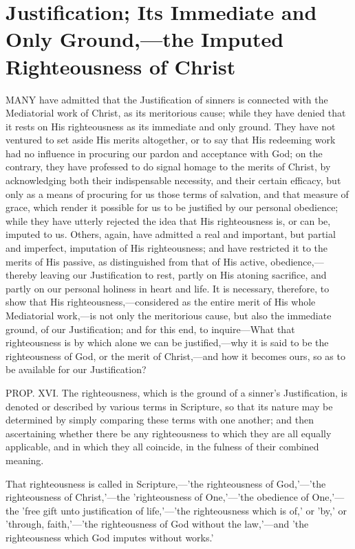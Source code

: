 \documentclass[
]{book}
\begin{document}
\hypertarget{justification-its-immediate-and-only-groundthe-imputed-righteousness-of-christ}{%
\chapter{Justification; Its Immediate and Only Ground,---the Imputed Righteousness of Christ}\label{justification-its-immediate-and-only-groundthe-imputed-righteousness-of-christ}}

MANY have admitted that the Justification of sinners is connected with the Mediatorial work of Christ, as its meritorious cause; while they have denied that it rests on His righteousness as its immediate and only ground. They have not ventured to set aside His merits altogether, or to say that His redeeming work had no influence in procuring our pardon and acceptance with God; on the contrary, they have professed to do signal homage to the merits of Christ, by acknowledging both their indispensable necessity, and their certain efficacy, but only as a means of procuring for us those terms of salvation, and that measure of grace, which render it possible for us to be justified by our personal obedience; while they have utterly rejected the idea that His righteousness is, or can be, imputed to us. Others, again, have admitted a real and important, but partial and imperfect, imputation of His righteousness; and have restricted it to the merits of His passive, as distinguished from that of His active, obedience,---thereby leaving our Justification to rest, partly on His atoning sacrifice, and partly on our personal holiness in heart and life. It is necessary, therefore, to show that His righteousness,---considered as the entire merit of His whole Mediatorial work,---is not only the meritorious cause, but also the immediate ground, of our Justification; and for this end, to inquire---What that righteousness is by which alone we can be justified,---why it is said to be the righteousness of God, or the merit of Christ,---and how it becomes ours, so as to be available for our Justification?

PROP. XVI. The righteousness, which is the ground of a sinner's Justification, is denoted or described by various terms in Scripture, so that its nature may be determined by simply comparing these terms with one another; and then ascertaining whether there be any righteousness to which they are all equally applicable, and in which they all coincide, in the fulness of their combined meaning.

That righteousness is called in Scripture,---'the righteousness of God,'---'the righteousness of Christ,'---the 'righteousness of One,'---'the obedience of One,'---the 'free gift unto justification of life,'---'the righteousness which is of,' or 'by,' or 'through, faith,'---'the righteousness of God without the law,'---and 'the righteousness which God imputes without works.'
\end{document}
